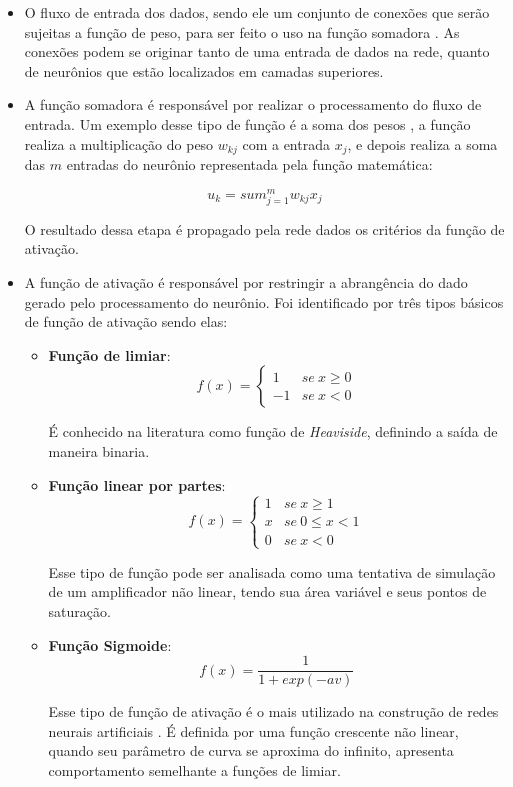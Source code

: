 \begin{itemize}
\item O fluxo de entrada dos dados, sendo ele um conjunto de conexões que serão sujeitas a função de peso, para ser feito o uso na função somadora \cite{haykin2001}. As conexões podem se originar tanto de uma entrada de dados na rede, quanto de neurônios que estão localizados em camadas superiores.
\item A função somadora é responsável por realizar o processamento do fluxo de entrada.
Um exemplo desse tipo de função é a soma dos pesos \cite{Kriesel2007NeuralNetworks}, a função realiza a multiplicação do peso $w_{kj}$ com a entrada $x_j$, e depois realiza a soma das $m$ entradas do neurônio representada pela função matemática:
\par \[u_k = sum_{j=1}^{m} w_{kj}x_j\]
\par O resultado dessa etapa é propagado pela rede dados os critérios da função de ativação.
\item A função de ativação é responsável por restringir a abrangência do dado gerado pelo processamento do neurônio. Foi identificado por \cite{haykin2001} três tipos básicos de função de ativação sendo elas:
  \begin{itemize}
    \item \textbf{Função de limiar}:
\[ f(x)= \begin{cases} 1&se \ x \ge 0 \\ -1 & se\ x < 0 \end{cases} \]
      \par É conhecido na literatura como função de \textit{Heaviside}, definindo a saída de maneira binaria.
    \item \textbf{Função linear por partes}: 
\[ f(x)= \begin{cases} 1&se \ x \ge 1 \\x & se\ 0\le x < 1 \\ 0 & se\ x < 0 \end{cases} \]
      \par Esse tipo de função pode ser analisada como uma tentativa de simulação de um amplificador não linear, tendo sua área variável e seus pontos de saturação. 
    \item \textbf{Função Sigmoide}: 
\[ f(x)= \frac{1}{1 + exp(-av)} \]
      \par Esse tipo de função de ativação é o mais utilizado na construção de redes neurais artificiais \cite{haykin2001}. É definida por uma função crescente não linear, quando seu parâmetro de curva se aproxima do infinito, apresenta comportamento semelhante a funções de limiar.
  \end{itemize}
\end{itemize}
